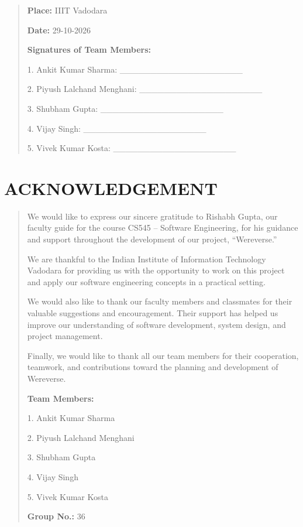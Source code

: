 \documentclass[12pt,a4paper]{article}
\begin{document}
\begin{quote}
\textbf{Place:} IIIT Vadodara

\textbf{Date:} 29-10-2026

\textbf{Signatures of Team Members:}

1. Ankit Kumar Sharma: \_\_\_\_\_\_\_\_\_\_\_\_\_\_\_\_\_\_\_\_

2. Piyush Lalchand Menghani: \_\_\_\_\_\_\_\_\_\_\_\_\_\_\_\_\_\_\_\_

3. Shubham Gupta: \_\_\_\_\_\_\_\_\_\_\_\_\_\_\_\_\_\_\_\_

4. Vijay Singh: \_\_\_\_\_\_\_\_\_\_\_\_\_\_\_\_\_\_\_\_

5. Vivek Kumar Kosta: \_\_\_\_\_\_\_\_\_\_\_\_\_\_\_\_\_\_\_\_
\end{quote}

\clearpage
\section*{ACKNOWLEDGEMENT}\label{acknowledgement}

\begin{quote}
We would like to express our sincere gratitude to Rishabh Gupta, our
faculty guide for the course CS545 -- Software Engineering, for his
guidance and support throughout the development of our project,
``Wereverse.''

We are thankful to the Indian Institute of Information Technology
Vadodara for providing us with the opportunity to work on this project
and apply our software engineering concepts in a practical setting.

We would also like to thank our faculty members and classmates for their
valuable suggestions and encouragement. Their support has helped us
improve our understanding of software development, system design, and
project management.

Finally, we would like to thank all our team members for their
cooperation, teamwork, and contributions toward the planning and
development of Wereverse.

\textbf{Team Members:}

1. Ankit Kumar Sharma

2. Piyush Lalchand Menghani

3. Shubham Gupta

4. Vijay Singh

5. Vivek Kumar Kosta

\textbf{Group No.:} 36
\end{quote}
\end{document}
